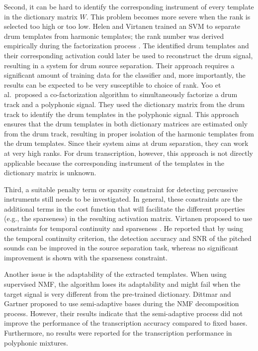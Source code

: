 \documentclass{article}
\begin{document}
Second, it can be hard to identify the corresponding instrument of every template in the dictionary matrix $W$. This problem becomes more severe when the rank is selected too high or too low. Helen and Virtanen trained an SVM to separate drum templates from harmonic templates; the rank number was derived empirically during the factorization process \cite{helen_separation_2005}. The identified drum templates and their corresponding activation could later be used to reconstruct the drum signal, resulting in a system for drum source separation. Their approach requires a significant amount of training data for the classifier and, more importantly, the results can be expected to be very susceptible to choice of rank. Yoo et al.\ proposed a co-factorization algorithm \cite{yoo_nonnegative_2010} to simultaneously factorize a drum track and a polyphonic signal. They used the dictionary matrix from the drum track to identify the drum templates in the polyphonic signal. This approach ensures that the drum templates in both dictionary matrices are estimated only from the drum track, resulting in proper isolation of the harmonic templates from the drum templates. Since their system aims at drum separation, they can work at very high ranks. For drum transcription, however, this approach is not directly applicable because the corresponding instrument of the templates in the dictionary matrix is unknown.  

Third, a suitable penalty term or sparsity constraint for detecting percussive instruments still needs to be investigated. In general, these constraints are the additional terms in the cost function that will facilitate the different properties (e.g., the sparseness) in the resulting activation matrix. Virtanen proposed to use constraints for temporal continuity and sparseness \cite{virtanen_ssnmf_2007}. He reported that by using the temporal continuity criterion, the detection accuracy and SNR of the pitched sounds can be improved in the source separation task, whereas no significant improvement is shown with the sparseness constraint. 

Another issue is the adaptability of the extracted templates. When using supervised NMF, the algorithm loses its adaptability and might fail when the target signal is very different from the pre-trained dictionary. Dittmar and Gartner proposed to use semi-adaptive bases during the NMF decomposition process\cite{Dittmar2014}. However, their results indicate that the semi-adaptive process did not improve the performance of the transcription accuracy compared to fixed bases. Furthermore, no results were reported for the transcription performance in polyphonic mixtures. 
\end{document}
